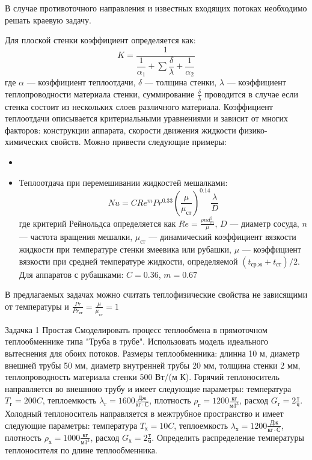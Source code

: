  В случае противоточного направления и известных входящих потоках необходимо решать краевую задачу.
 
 Для плоской стенки коэффициент определяется как:
 \begin{equation}
 	K=\dfrac{1}{\dfrac{1}{\alpha_1} + \sum \dfrac{\delta}{\lambda} + \dfrac{1}{\alpha_2}}
 \end{equation}
 где $\alpha$ --- коэффициент теплоотдачи, $\delta$ --- толщина стенки, $\lambda$ --- коэффициент теплопроводности материала стенки, суммирование $\frac{\delta}{\lambda}$ проводится в случае если стенка состоит из нескольких слоев различного материала. Коэффициент теплоотдачи описывается критериальными уравнениями и зависит от многих факторов: конструкции аппарата, скорости движения жидкости физико-химических свойств. Можно привести следующие примеры:
 \begin{itemize}
	 \item 
	 \item Теплоотдача при перемешивании жидкостей мешалками:
	 \begin{equation}
		Nu=C Re^m Pr^{0.33} \left(\dfrac{\mu}{\mu_{ст}}\right)^{0.14} \dfrac{\lambda}{D}
	 \end{equation}
	 где критерий Рейнольдса определяется как $Re=\frac{ \rho n d_m^2}{\mu}$, $D$ --- диаметр сосуда, $n$ --- частота вращения мешалки, $\mu_{ст}$ --- динамический коэффициент вязкости жидкости при температуре стенки змеевика или рубашки, $\mu$ --- коэффициент вязкости при средней температуре жидкости, определяемой $(t_{ср.ж}+t_{ст})/2$. Для аппаратов с рубашками: $C=0.36$, $m=0.67$
\end{itemize}

В предлагаемых задачах можно считать теплофизические свойства не зависящими от температуры и $\frac{Pr}{Pr_{ст}}=\frac{\mu}{\mu_{ст}}=1$

\newpage
Задачка 1 Простая
Смоделировать процесс теплообмена в прямоточном теплообменнике типа "Труба в трубе". Использовать модель идеального вытеснения для обоих потоков. Размеры теплообменника: длинна 10 м, диаметр внешней трубы 50 мм, диаметр внутренней трубы 20 мм, толщина стенки 2 мм, теплопроводность материала стенки 500 Вт/(м К). Горячий теплоноситель направляется во внешнюю трубу и имеет следующие параметры: температура $T_г=200 C$, теплоемкость $\lambda_г=1600\frac{Дж}{кг \cdot С}$, плотность $\rho_г=1200 \frac{кг}{м3^3}$, расход $G_г=2 \frac{т}{ч}$. Холодный теплоноситель направляется в межтрубное пространство и имеет следующие параметры: температура $T_х=10 C$, теплоемкость $\lambda_х=1200\frac{Дж}{кг \cdot С}$, плотность $\rho_х=1000 \frac{кг}{м3^3}$, расход $G_х=2 \frac{т}{ч}$.
Определить распределение температуры теплоносителя по длине теплообменника. 

